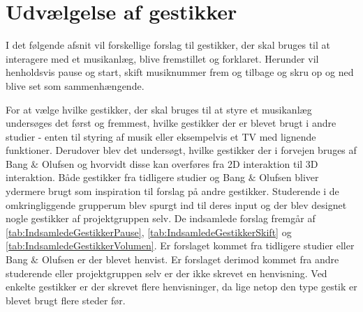 \section{Udvælgelse af gestikker}
\label{UdvaelgelseAfGestikker}
%
I det følgende afsnit vil forskellige forslag til gestikker, der skal bruges til at interagere med et musikanlæg, blive fremstillet og forklaret. Herunder vil henholdsvis pause og start, skift musiknummer frem og tilbage og skru op og ned blive set som sammenhængende.
 
For at vælge hvilke gestikker, der skal bruges til at styre et musikanlæg undersøges det først og fremmest, hvilke gestikker der er blevet brugt i andre studier - enten til styring af musik eller eksempelvis et TV med lignende funktioner. Derudover blev det undersøgt, hvilke gestikker der i forvejen bruges af Bang $\&$ Olufsen og hvorvidt disse kan overføres fra 2D interaktion til 3D interaktion. Både gestikker fra tidligere studier og Bang $\&$ Olufsen bliver ydermere brugt som inspiration til forslag på andre gestikker. Studerende i de omkringliggende grupperum blev spurgt ind til deres input og der blev designet nogle gestikker af projektgruppen selv. De indsamlede forslag fremgår af \autoref{tab:IndsamledeGestikkerPause}, \autoref{tab:IndsamledeGestikkerSkift} og \autoref{tab:IndsamledeGestikkerVolumen}. Er forslaget kommet fra tidligere studier eller Bang $\&$ Olufsen er der blevet henvist. Er forslaget derimod kommet fra andre studerende eller projektgruppen selv er der ikke skrevet en henvisning. Ved enkelte gestikker er der skrevet flere henvisninger, da lige netop den type gestik er blevet brugt flere steder før. 
%
